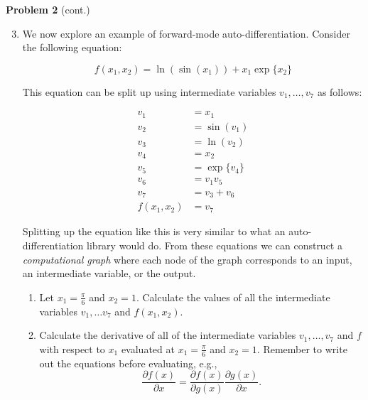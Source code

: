\documentclass[submit]{../harvardml}
\begin{document}
\begin{framed}
  \noindent\textbf{Problem 2} (cont.)\\
  \begin{enumerate}
    \setcounter{enumi}{2}

    \item  We now explore an example of forward-mode auto-differentiation. Consider the following
          equation:

          $$
            f(x_1, x_2) = \ln (\sin (x_1)) + x_1 \exp \{ x_2 \}
          $$

          This equation can be split up using intermediate variables $v_1, \dots, v_7$ as follows:

          \begin{align*}
            v_1         & = x_1            \\
            v_2         & = \sin (v_1)     \\
            v_3         & = \ln (v_2)      \\
            v_4         & = x_2            \\
            v_5         & = \exp \{ v_4 \} \\
            v_6         & = v_1v_5         \\
            v_7         & = v_3 + v_6      \\
            f(x_1, x_2) & = v_7
          \end{align*}

          Splitting up the equation like this is very similar to what an auto-differentiation
          library would do. From these equations we can construct a \textit{computational graph}
          where each node of the graph corresponds to an input, an intermediate variable, or
          the output.

          \begin{enumerate}
            \item Let $x_1 = \frac{\pi}{6}$ and $x_2 = 1$. Calculate the values of all the
                  intermediate variables $v_1, \dots v_7$ and $f(x_1,x_2)$.
            \item Calculate the derivative of
                  all of the intermediate variables $v_1, \dots, v_7$ and
                  $f$ with respect to $x_1$ evaluated
                  at $x_1 = \frac{\pi}{6}$ and $x_2 = 1$. Remember to write out the equations before evaluating, e.g.,
                  \[
                    \frac{\partial f(x)}{\partial x} = \frac{\partial f(x)}{\partial g(x)} \frac{\partial g(x)}{\partial x}.
                  \]
          \end{enumerate}
  \end{enumerate}
\end{framed}
\end{document}
